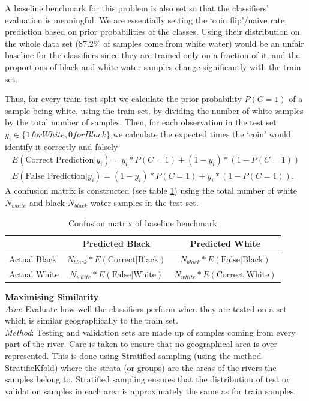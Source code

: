 A baseline benchmark for this problem is also set so that the classifiers' evaluation is meaningful. We are essentially setting the `coin flip'/naive rate; prediction based on prior probabilities of the classes. Using their distribution on the whole data set (87.2\% of samples come from white water) would be an unfair baseline for the classifiers since they are trained only on a fraction of it, and the proportions of black and white water samples change significantly with the train set. 

Thus, for every train-test split we calculate the prior probability $P(C=1)$ of a sample being white, using the train set, by dividing the number of white samples by the total number of samples. Then, for each observation in the test set $y_i \in \{1 for White, 0 for Black\}$ we calculate the expected times the `coin' would identify it correctly and falsely
\begin{align}
	E(\text{Correct Prediction}|y_i ) = y_i*P(C=1) + (1-y_i)*(1-P(C=1)) \\
	E(\text{False Prediction}|y_i) = (1-y_i)*P(C=1) + y_i*(1-P(C=1)).
\end{align}
A confusion matrix is constructed (see table \ref{table:baseline}) using the total number of white $N_{white}$ and black $N_{black}$ water samples in the test set.
\begin{table}[h]

	\centering

	\begin{tabularx}{\textwidth}{l| c c}
	 
		 &Predicted Black&Predicted White\\ 
		
		\hline
		Actual Black&$N_{black}*E(\text{Correct}|\text{Black} )$&$N_{black}*E(\text{False}|\text{Black})$\\
		Actual White& $N_{white}*E(\text{False}|\text{White} )$&$N_{white}*E(\text{Correct}|\text{White})$

	\end{tabularx}
	\caption{Confusion matrix of baseline benchmark}
		\label{table:baseline}
\end{table}

{ \large\bf Maximising Similarity} \\
\textit{Aim}: Evaluate how well the classifiers perform when they are tested on a set which is similar geographically to the train set.\\
\textit{Method}: Testing and validation sets are made up of samples coming from every part of the river. Care is taken to ensure that no geographical area is over represented. This is done using Stratified sampling (using the method StratifieKfold) where the strata (or groups) are the areas of the rivers the samples belong to. Stratified sampling ensures that the distribution of test or validation samples in each area is approximately the same as for train samples.




